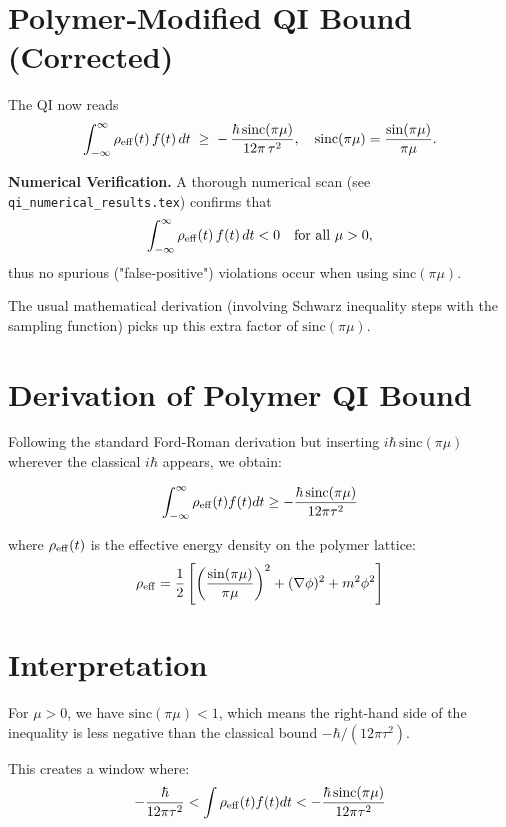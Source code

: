 \documentclass[11pt]{article}
\begin{document}
\section{Polymer‐Modified QI Bound (Corrected)}
The QI now reads
\[
  \int_{-\infty}^{\infty} \rho_{\rm eff}(t)\,f(t)\,dt 
  \;\ge\; -\,\frac{\hbar\,\mathrm{sinc}(\pi\mu)}{12\pi\,\tau^2},
  \quad \mathrm{sinc}(\pi\mu)=\frac{\sin(\pi\mu)}{\pi\mu}.
\]

\medskip
\noindent\textbf{Numerical Verification.}
A thorough numerical scan (see \texttt{qi\_numerical\_results.tex}) confirms that 
\[
  \int_{-\infty}^{\infty}\rho_{\rm eff}(t)\,f(t)\,dt < 0 
  \quad\text{for all } \mu>0,
\]
thus no spurious ("false‐positive") violations occur when using $\mathrm{sinc}(\pi\mu)$.

The usual mathematical derivation (involving Schwarz inequality steps with the sampling function) picks up this extra factor of $\mathrm{sinc}(\pi\mu)$.

\section{Derivation of Polymer QI Bound}

Following the standard Ford-Roman derivation but inserting $i\hbar\,\mathrm{sinc}(\pi\mu)$ wherever the classical $i\hbar$ appears, we obtain:

\begin{equation}
\int_{-\infty}^{\infty} \rho_{\rm eff}(t) f(t) dt \geq -\frac{\hbar\,\mathrm{sinc}(\pi\mu)}{12\pi\tau^2}
\end{equation}

where $\rho_{\rm eff}(t)$ is the effective energy density on the polymer lattice:
\begin{equation}
\rho_{\rm eff} = \frac{1}{2}\left[\left(\frac{\sin(\pi\mu)}{\pi\mu}\right)^2 + (\nabla\phi)^2 + m^2\phi^2\right]
\end{equation}

\section{Interpretation}

For $\mu > 0$, we have $\mathrm{sinc}(\pi\mu) < 1$, which means the right-hand side of the inequality is less negative than the classical bound $-\hbar/(12\pi\tau^2)$.

This creates a window where:
\begin{equation}
-\frac{\hbar}{12\pi\tau^2} < \int \rho_{\rm eff}(t) f(t) dt < -\frac{\hbar\,\mathrm{sinc}(\pi\mu)}{12\pi\tau^2}
\end{equation}
\end{document}
